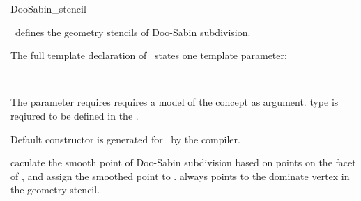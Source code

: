 \begin{ccRefClass}{DooSabin_stencil}

\ccDefinition

\ccClassTemplateName\ defines the 
geometry stencils of Doo-Sabin subdivision. 


\ccParameters

The full template declaration of \ccClassTemplateName\ states one
template parameter:

\begin{tabbing}
 \=\\
\end{tabbing}
   
The  parameter requires requires a model of 
the  concept as argument.  
type is reqiured to be defined in the .

\ccCreation

Default constructor is generated for \ccClassTemplateName\ by the compiler.

\ccThree{}{}{}

{caculate the smooth point of Doo-Sabin subdivision 
based on points on the facet of , and assign the smoothed 
point to .  always points to the dominate vertex  
in the geometry stencil.}


\ccSeeAlso

\\

\end{ccRefClass}

\ccRefPageEnd


